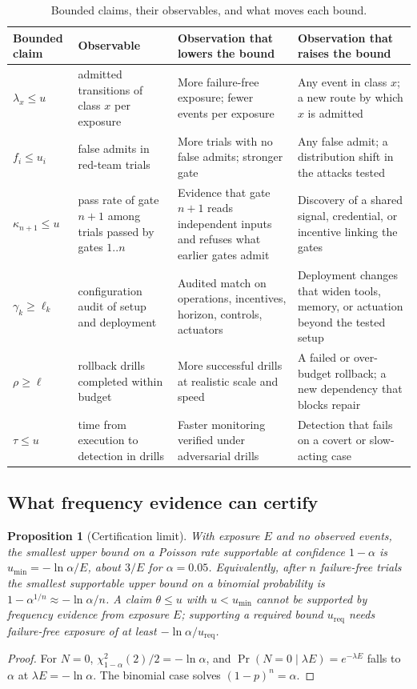 \documentclass[11pt]{article}
\newtheorem{proposition}[theorem]{Proposition}
\theoremstyle{definition}
\begin{document}
\begin{table}[t]
\centering\footnotesize
\renewcommand{\arraystretch}{1.2}
\begin{tabular}{@{}p{}p{}p{}p{}@{}}
\toprule
Bounded claim & Observable & Observation that lowers the bound & Observation that raises the bound\\
\midrule
$\lambda_x\le u$ & admitted transitions of class $x$ per exposure & More failure-free exposure; fewer events per exposure & Any event in class $x$; a new route by which $x$ is admitted\\
$f_i\le u_i$ & false admits in red-team trials & More trials with no false admits; stronger gate & Any false admit; a distribution shift in the attacks tested\\
$\kappa_{n+1}\le u$ & pass rate of gate $n+1$ among trials passed by gates $1..n$ & Evidence that gate $n+1$ reads independent inputs and refuses what earlier gates admit & Discovery of a shared signal, credential, or incentive linking the gates\\
$\gamma_k\ge\ell_k$ & configuration audit of setup and deployment & Audited match on operations, incentives, horizon, controls, actuators & Deployment changes that widen tools, memory, or actuation beyond the tested setup\\
$\rho\ge\ell$ & rollback drills completed within budget & More successful drills at realistic scale and speed & A failed or over-budget rollback; a new dependency that blocks repair\\
$\tau\le u$ & time from execution to detection in drills & Faster monitoring verified under adversarial drills & Detection that fails on a covert or slow-acting case\\
\bottomrule
\end{tabular}
\caption{Bounded claims, their observables, and what moves each bound.}\label{tab:F}
\end{table}

\subsection{What frequency evidence can certify}

\begin{proposition}[Certification limit]\label{prop:F2}
With exposure $E$ and no observed events, the smallest upper bound on a Poisson rate supportable at confidence $1-\alpha$ is $u_{\min}=-\ln\alpha/E$, about $3/E$ for $\alpha=0.05$. Equivalently, after $n$ failure-free trials the smallest supportable upper bound on a binomial probability is $1-\alpha^{1/n}\approx-\ln\alpha/n$. A claim $\theta\le u$ with $u<u_{\min}$ cannot be supported by frequency evidence from exposure $E$; supporting a required bound $u_{\mathrm{req}}$ needs failure-free exposure of at least $-\ln\alpha/u_{\mathrm{req}}$.
\end{proposition}
\begin{proof}
For $N=0$, $\chi^2_{1-\alpha}(2)/2=-\ln\alpha$, and $\Pr(N=0\mid\lambda E)=e^{-\lambda E}$ falls to $\alpha$ at $\lambda E=-\ln\alpha$. The binomial case solves $(1-p)^n=\alpha$.
\end{proof}
\end{document}
